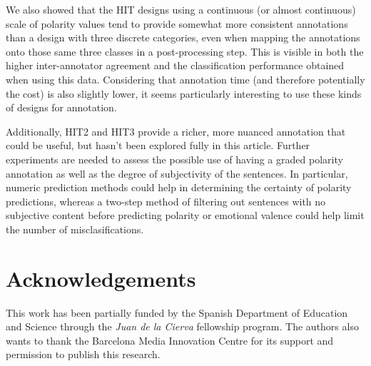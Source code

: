 \documentclass[11pt, a4paper,onecolumn]{article}
\begin{document}
We also showed that the HIT designs using a continuous (or almost continuous) scale of polarity values tend to provide somewhat more consistent annotations than a design with three discrete categories, even when mapping the annotations onto those same three classes in a post-processing step.  This is visible in both the higher inter-annotator agreement and the classification performance obtained when using this data.  Considering that annotation time (and therefore potentially the cost) is also slightly lower, it seems particularly interesting to use these kinds of designs for annotation.

Additionally, HIT2 and HIT3 provide a richer, more nuanced annotation that could be useful, but hasn't been explored fully in this article.  Further experiments are needed to assess the possible use of having a graded polarity annotation as well as the degree of subjectivity of the sentences.  In particular, numeric prediction methods could help in determining the certainty of polarity predictions, whereas a two-step method of filtering out sentences with no subjective content before predicting polarity or emotional valence could help limit the number of misclasifications.


\section{Acknowledgements}

This work has been partially funded by the Spanish Department of Education and Science through the \textit{Juan de la Cierva} fellowship program. The authors also wants to thank the Barcelona Media Innovation Centre for its support and permission to publish this research. 





\end{document}
